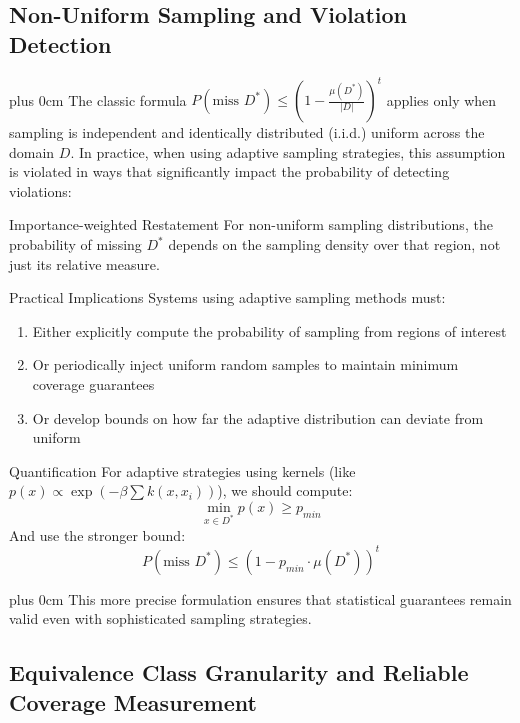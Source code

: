 \documentclass[11pt,a4paper]{article}
\newcommand{\justifytext}{\leftskip=0pt \rightskip=0pt plus 0cm}
\begin{document}
\subsection{Non-Uniform Sampling and Violation Detection}

\justifytext
The classic formula $P(\text{miss } D^*) \leq \left(1 - \frac{\mu(D^*)}{|D|}\right)^t$ applies only when sampling is independent and identically distributed (i.i.d.) uniform across the domain $D$. In practice, when using adaptive sampling strategies, this assumption is violated in ways that significantly impact the probability of detecting violations:

\begin{alertbox}{Importance-weighted Restatement}
For non-uniform sampling distributions, the probability of missing $D^*$ depends on the sampling density over that region, not just its relative measure.
\end{alertbox}

\begin{alertbox}{Practical Implications}
Systems using adaptive sampling methods must:
\begin{enumerate}
\item Either explicitly compute the probability of sampling from regions of interest
\item Or periodically inject uniform random samples to maintain minimum coverage guarantees
\item Or develop bounds on how far the adaptive distribution can deviate from uniform
\end{enumerate}
\end{alertbox}

\begin{alertbox}{Quantification}
For adaptive strategies using kernels (like $p(x) \propto \exp(-\beta \sum k(x, x_i))$), we should compute:
\begin{equation}
\min_{x \in D^*} p(x) \geq p_{min}
\end{equation}
And use the stronger bound:
\begin{equation}
P(\text{miss } D^*) \leq (1 - p_{min} \cdot \mu(D^*))^t
\end{equation}
\end{alertbox}

\justifytext
This more precise formulation ensures that statistical guarantees remain valid even with sophisticated sampling strategies.

\subsection{Equivalence Class Granularity and Reliable Coverage Measurement}
\end{document}
